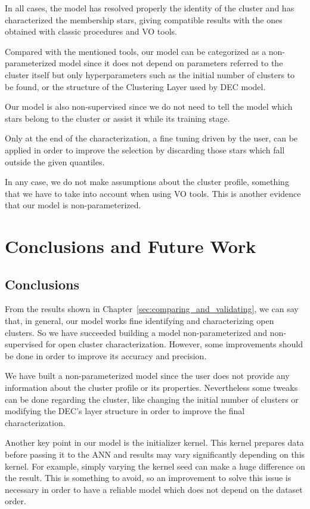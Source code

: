 \documentclass[11pt, a4paper, english]{book}
\begin{document}
In all cases, the model has resolved properly the identity of the cluster
and has characterized the membership stars,
giving compatible results with the ones obtained with classic procedures and VO tools.

Compared with the mentioned tools, our model can be categorized as a non-parameterized
model since it does not depend on parameters referred to the cluster itself
but only hyperparameters such as the initial number of clusters to be found,
or the structure of the Clustering Layer used by DEC model.

Our model is also non-supervised since we do not need to tell the model
which stars belong to the cluster or assist it while its training stage.

Only at the end of the characterization, a fine tuning driven by the user,
can be applied in order to improve the selection by discarding those
stars which fall outside the given quantiles.

In any case, we do not make assumptions about the cluster profile,
something that we have to take into account when using VO tools.
This is another evidence that our model is non-parameterized.

\chapter{Conclusions and Future Work}

\section{Conclusions}

From the results shown in Chapter~\ref{sec:comparing_and_validating},
we can say that, in general, our model works fine identifying and characterizing open clusters.
So we have succeeded building a model non-parameterized and non-supervised for open cluster characterization.
However, some improvements should be done in order to improve its accuracy and precision.

We have built a non-parameterized model since the user does not provide any information
about the cluster profile or its properties.
Nevertheless some tweaks can be done regarding the cluster,
like changing the initial number of clusters or modifying the DEC's layer structure
in order to improve the final characterization.

Another key point in our model is the initializer kernel.
This kernel prepares data before passing it to the ANN
and results may vary significantly depending on this kernel.
For example, simply varying the kernel seed can make a huge difference on the result.
This is something to avoid, so an improvement to solve this issue is necessary in order
to have a reliable model which does not depend on the dataset order.
\end{document}
